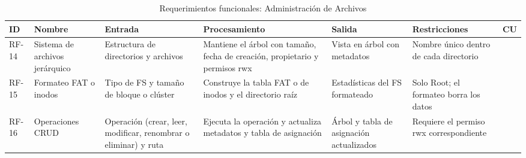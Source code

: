 \documentclass[conference]{IEEEtran}
\begin{document}
\begin{table}[!t]
\caption{Requerimientos funcionales: Administración de Archivos}
\label{tab:rf-archivos}
\footnotesize\renewcommand{\arraystretch}{1.1}\setlength{\tabcolsep}{2pt}
\begin{tabular}{|>{\raggedright\arraybackslash}p{0.95cm}|>{\raggedright\arraybackslash}p{2.3cm}|>{\raggedright\arraybackslash}p{3.2cm}|>{\raggedright\arraybackslash}p{3.9cm}|>{\raggedright\arraybackslash}p{2.8cm}|>{\raggedright\arraybackslash}p{2.8cm}|>{\raggedright\arraybackslash}p{0.95cm}|}
\hline
\textbf{ID} & \textbf{Nombre} & \textbf{Entrada} & \textbf{Procesamiento} & \textbf{Salida} & \textbf{Restricciones} & \textbf{CU}\\ \hline
RF-14 & Sistema de archivos jerárquico & Estructura de directorios y archivos & Mantiene el árbol con tamaño, fecha de creación, propietario y permisos rwx & Vista en árbol con metadatos & Nombre único dentro de cada directorio & 07\\ \hline
RF-15 & Formateo FAT o inodos & Tipo de FS y tamaño de bloque o clúster & Construye la tabla FAT o de inodos y el directorio raíz & Estadísticas del FS formateado & Solo Root; el formateo borra los datos & 08\\ \hline
RF-16 & Operaciones CRUD & Operación (crear, leer, modificar, renombrar o eliminar) y ruta & Ejecuta la operación y actualiza metadatos y tabla de asignación & Árbol y tabla de asignación actualizados & Requiere el permiso rwx correspondiente & 07\\ \hline
\end{tabular}
\end{table}
\end{document}
